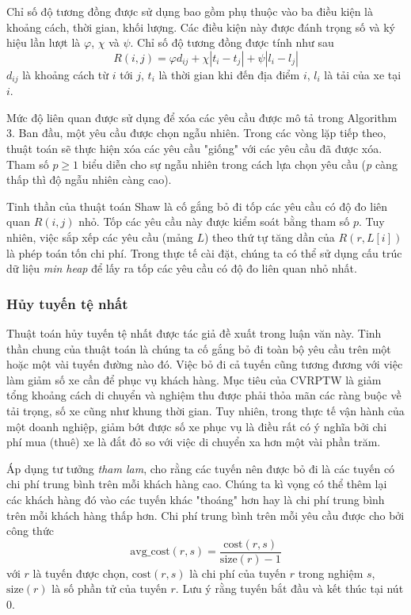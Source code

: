 Chỉ số độ tương đồng được sử dụng bao gồm phụ thuộc vào ba điều kiện là khoảng cách, thời gian, khối lượng. Các điều kiện này được đánh trọng số và ký hiệu lần lượt là $\varphi$, $\chi$ và $\psi$. Chỉ số độ tương đồng được tính như sau
\begin{equation}
	\label{eq:shaw_related}
	R(i,j) = \varphi d_{ij} + \chi |t_{i}-t_{j}| + \psi|l_i - l_j|
\end{equation}
$d_{ij}$ là khoảng cách từ $i$ tới $j$, $t_i$ là thời gian khi đến địa điểm $i$, $l_i$ là tải của xe tại $i$.

Mức độ liên quan được sử dụng để xóa các yêu cầu được mô tả trong Algorithm 3. Ban đầu, một yêu cầu được chọn ngẫu nhiên. Trong các vòng lặp tiếp theo, thuật toán sẽ thực hiện xóa các yêu cầu "giống" với các yêu cầu đã được xóa. Tham số $p \geqslant 1$ biểu diễn cho sự ngẫu nhiên trong cách lựa chọn yêu cầu (\textit{p} càng thấp thì độ ngẫu nhiên càng cao).

Tinh thần của thuật toán Shaw là cố gắng bỏ đi tốp các yêu cầu có độ đo liên quan $R(i,j)$ nhỏ. Tốp các yêu cầu này được kiểm soát bằng tham số $p$. Tuy nhiên, việc sắp xếp các yêu cầu (mảng $L$) theo thứ tự tăng dần của $R(r, L[i])$ là phép toán tốn chi phí. Trong thực tế cài đặt, chúng ta có thể sử dụng cấu trúc dữ liệu \textit{min heap} để lấy ra tốp các yêu cầu có độ đo liên quan nhỏ nhất.

\subsubsection*{Hủy tuyến tệ nhất}
Thuật toán hủy tuyến tệ nhất được tác giả đề xuất trong luận văn này. Tinh thần chung của thuật toán là chúng ta cố gắng bỏ đi toàn bộ yêu cầu trên một hoặc một vài tuyến đường nào đó. Việc bỏ đi cả tuyến cũng tương đương với việc làm giảm số xe cần để phục vụ khách hàng. Mục tiêu của CVRPTW là giảm tổng khoảng cách di chuyển và nghiệm thu được phải thỏa mãn các ràng buộc về tải trọng, số xe cũng như khung thời gian. Tuy nhiên, trong thực tế vận hành của một doanh nghiệp, giảm bớt được số xe phục vụ là điều rất có ý nghĩa bởi chi phí mua (thuê) xe là đắt đỏ so với việc di chuyển xa hơn một vài phần trăm.

Áp dụng tư tưởng \textit{tham lam}, cho rằng các tuyến nên được bỏ đi là các tuyến có chi phí trung bình trên mỗi khách hàng cao. Chúng ta kì vọng có thể thêm lại các khách hàng đó vào các tuyến khác "thoáng" hơn hay là chi phí trung bình trên mỗi khách hàng thấp hơn. Chi phí trung bình trên mỗi yêu cầu được cho bởi công thức
\begin{equation}
	\label{eq:destroy_route}
	\text{avg\_cost}(r, s) = \frac{\text{cost}(r, s)}{\text{size}(r)-1}
\end{equation}
với $r$ là tuyến được chọn, $\text{cost}(r,s)$ là chi phí của tuyến $r$ trong nghiệm $s$, $\text{size}(r)$ là số phần tử của tuyến $r$. Lưu ý rằng tuyến bắt đầu và kết thúc tại nút $0$.

